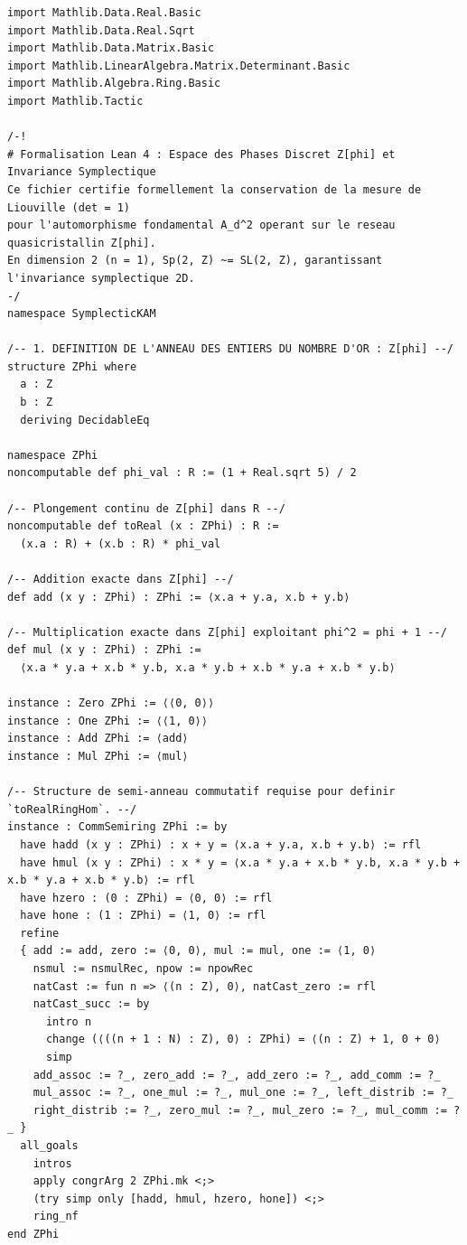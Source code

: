 \documentclass[10pt,twocolumn,a4paper]{article}
\theoremstyle{plain}
\theoremstyle{definition}
\begin{document}
\begin{lstlisting}[caption={Code Lean 4 Certifié (Intégral 146 Lignes)}]
import Mathlib.Data.Real.Basic
import Mathlib.Data.Real.Sqrt
import Mathlib.Data.Matrix.Basic
import Mathlib.LinearAlgebra.Matrix.Determinant.Basic
import Mathlib.Algebra.Ring.Basic
import Mathlib.Tactic

/-!
# Formalisation Lean 4 : Espace des Phases Discret Z[phi] et Invariance Symplectique
Ce fichier certifie formellement la conservation de la mesure de Liouville (det = 1)
pour l'automorphisme fondamental A_d^2 operant sur le reseau quasicristallin Z[phi].
En dimension 2 (n = 1), Sp(2, Z) ~= SL(2, Z), garantissant l'invariance symplectique 2D.
-/
namespace SymplecticKAM

/-- 1. DEFINITION DE L'ANNEAU DES ENTIERS DU NOMBRE D'OR : Z[phi] --/
structure ZPhi where
  a : Z
  b : Z
  deriving DecidableEq

namespace ZPhi
noncomputable def phi_val : R := (1 + Real.sqrt 5) / 2

/-- Plongement continu de Z[phi] dans R --/
noncomputable def toReal (x : ZPhi) : R :=
  (x.a : R) + (x.b : R) * phi_val

/-- Addition exacte dans Z[phi] --/
def add (x y : ZPhi) : ZPhi := ⟨x.a + y.a, x.b + y.b⟩

/-- Multiplication exacte dans Z[phi] exploitant phi^2 = phi + 1 --/
def mul (x y : ZPhi) : ZPhi :=
  ⟨x.a * y.a + x.b * y.b, x.a * y.b + x.b * y.a + x.b * y.b⟩

instance : Zero ZPhi := ⟨⟨0, 0⟩⟩
instance : One ZPhi := ⟨⟨1, 0⟩⟩
instance : Add ZPhi := ⟨add⟩
instance : Mul ZPhi := ⟨mul⟩

/-- Structure de semi-anneau commutatif requise pour definir `toRealRingHom`. --/
instance : CommSemiring ZPhi := by
  have hadd (x y : ZPhi) : x + y = ⟨x.a + y.a, x.b + y.b⟩ := rfl
  have hmul (x y : ZPhi) : x * y = ⟨x.a * y.a + x.b * y.b, x.a * y.b + x.b * y.a + x.b * y.b⟩ := rfl
  have hzero : (0 : ZPhi) = ⟨0, 0⟩ := rfl
  have hone : (1 : ZPhi) = ⟨1, 0⟩ := rfl
  refine
  { add := add, zero := ⟨0, 0⟩, mul := mul, one := ⟨1, 0⟩
    nsmul := nsmulRec, npow := npowRec
    natCast := fun n => ⟨(n : Z), 0⟩, natCast_zero := rfl
    natCast_succ := by
      intro n
      change (⟨((n + 1 : N) : Z), 0⟩ : ZPhi) = ⟨(n : Z) + 1, 0 + 0⟩
      simp
    add_assoc := ?_, zero_add := ?_, add_zero := ?_, add_comm := ?_
    mul_assoc := ?_, one_mul := ?_, mul_one := ?_, left_distrib := ?_
    right_distrib := ?_, zero_mul := ?_, mul_zero := ?_, mul_comm := ?_ }
  all_goals
    intros
    apply congrArg 2 ZPhi.mk <;>
    (try simp only [hadd, hmul, hzero, hone]) <;>
    ring_nf
end ZPhi


\end{lstlisting}
\end{document}
